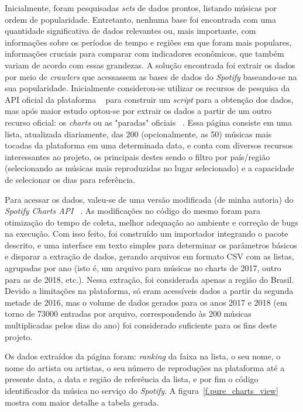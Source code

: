 Inicialmente, foram pesquisadas \textit{sets} de dados prontos, listando músicas por ordem de popularidade. Entretanto, nenhuma base foi encontrada com uma quantidade significativa de dados relevantes ou, mais importante, com informações sobre os períodos de tempo e regiões em que foram mais populares, informações cruciais para comparar com indicadores econômicos, que também variam de acordo com essas grandezas. A solução encontrada foi extrair os dados por meio de \textit{crawlers} que acessassem as bases de dados do \textit{Spotify} baseando-se na sua popularidade. Inicialmente considerou-se utilizar os recursos de pesquisa da API oficial da plataforma ~\cite{spotify_api_doc} para construir um \textit{script} para a obtenção dos dados, mas após maior estudo optou-se por extrair os dados a partir de um outro recurso oficial: os \textit{charts} ou as "paradas" oficiais ~\cite{spotify_charts}. Essa página consiste em uma lista, atualizada diariamente, das 200 (opcionalmente, as 50) músicas mais tocadas da plataforma em uma determinada data, e conta com diversos recursos interessantes ao projeto, os principais destes sendo o filtro por país/região (selecionando as músicas mais reproduzidas no lugar selecionado) e a capacidade de selecionar os dias para referência.

Para acessar os dados, valeu-se de uma versão modificada (de minha autoria) do \textit{Spotify Charts API} ~\cite{mod_fycharts}. As modificações no código do mesmo foram para otimização do tempo de coleta, melhor adequação ao ambiente e correção de bugs na execução. Com isso feito, foi construído um importador integrando o pacote descrito, e uma interface em texto simples para determinar os parâmetros básicos e disparar a extração de dados, gerando arquivos em formato CSV com as listas, agrupadas por ano (isto é, um arquivo para músicas no charts de 2017, outro para as de 2018, etc.). Nessa extração, foi considerada apenas a região do Brasil. Devido a limitações na plataforma, só eram acessíveis dados a partir da segunda metade de 2016, mas o volume de dados gerados para os anos 2017 e 2018 (em torno de 73000 entradas por arquivo, correspondendo às 200 músicas multiplicadas pelos dias do ano) foi considerado suficiente para os fins deste projeto.

Os dados extraídos da página foram: \textit{ranking} da faixa na lista, o seu nome, o nome do artista ou artistas, o seu número de reproduções na plataforma até a presente data, a data e região de referência da lista, e por fim o código identificador da música no serviço do \textit{Spotify}. A figura~\ref{f.pure_charts_view} mostra com maior detalhe a tabela gerada.

